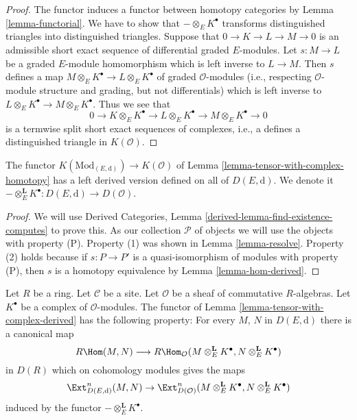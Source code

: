 \begin{proof}
The functor induces a functor between homotopy categories by
Lemma \ref{lemma-functorial}.
We have to show that $- \otimes_E K^\bullet$ transforms distinguished
triangles into distinguished triangles.
Suppose that $0 \to K \to L \to M \to 0$ is an admissible short
exact sequence of differential graded $E$-modules. Let $s : M \to L$ be
a graded $E$-module homomorphism which is left inverse to $L \to M$.
Then $s$ defines a map $M \otimes_E K^\bullet \to L \otimes_E K^\bullet$
of graded $\mathcal{O}$-modules (i.e., respecting $\mathcal{O}$-module
structure and grading, but not differentials)
which is left inverse to $L \otimes_E K^\bullet \to M \otimes_E K^\bullet$.
Thus we see that
$$
0 \to K \otimes_E K^\bullet \to L \otimes_E K^\bullet \to
M \otimes_E K^\bullet \to 0
$$
is a termwise split short exact sequences of complexes, i.e., a
defines a distinguished triangle in $K(\mathcal{O})$.
\end{proof}

\begin{lemma}
\label{lemma-tensor-with-complex-derived}
The functor $K(\text{Mod}_{(E, \text{d})}) \to K(\mathcal{O})$
of Lemma \ref{lemma-tensor-with-complex-homotopy} has a left derived
version defined on all of $D(E, \text{d})$. We denote it
$- \otimes_E^\mathbf{L} K^\bullet : D(E, \text{d}) \to D(\mathcal{O})$.
\end{lemma}

\begin{proof}
We will use
Derived Categories, Lemma \ref{derived-lemma-find-existence-computes}
to prove this. As our collection $\mathcal{P}$
of objects we will use the objects with property (P).
Property (1) was shown in Lemma \ref{lemma-resolve}.
Property (2) holds because if $s : P \to P'$ is a quasi-isomorphism
of modules with property (P), then $s$ is a homotopy equivalence
by Lemma \ref{lemma-hom-derived}.
\end{proof}

\begin{lemma}
\label{lemma-upgrade-tensor-with-complex-derived}
Let $R$ be a ring. Let $\mathcal{C}$ be a site. Let $\mathcal{O}$
be a sheaf of commutative $R$-algebras. Let $K^\bullet$
be a complex of $\mathcal{O}$-modules.
The functor
of Lemma \ref{lemma-tensor-with-complex-derived} has the following
property: For every $M$, $N$ in $D(E, \text{d})$ there is a
canonical map
$$
R\Hom(M, N)
\longrightarrow
R\Hom_\mathcal{O}(M \otimes_E^\mathbf{L} K^\bullet,
N \otimes_E^\mathbf{L} K^\bullet)
$$
in $D(R)$ which on cohomology modules gives the maps
$$
\Ext^n_{D(E, \text{d})}(M, N) \to
\Ext^n_{D(\mathcal{O})}
(M \otimes_E^\mathbf{L} K^\bullet, N \otimes_E^\mathbf{L} K^\bullet)
$$
induced by the functor $- \otimes_E^\mathbf{L} K^\bullet$.
\end{lemma}

